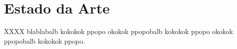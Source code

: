 \chapter{Estado da Arte} \label{ch:eda}

XXXX blablabalb kokokok ppopo
okokok ppopobalb kokokok ppopo
okokok ppopobalb kokokok ppopo.





